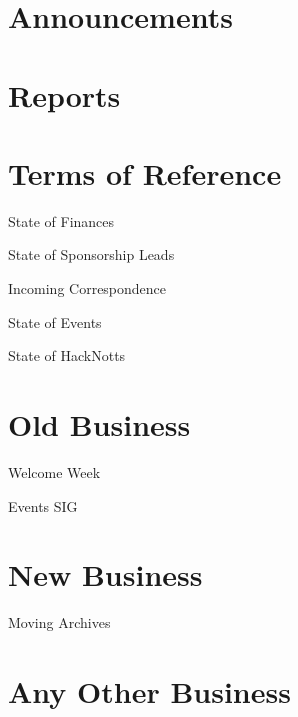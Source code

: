 \documentclass[11pt,hacksoc,agenda]{meetingmins}
\begin{document}
\maketitle

\section{Announcements}

\section{Reports}

\section{Terms of Reference}
\begin{items}
\item {State of Finances}
\item {State of Sponsorship Leads}
\item {Incoming Correspondence}
\item {State of Events}
\item {State of HackNotts}
\end{items}

\section{Old Business}
\begin{items}
\item {Welcome Week} 
\item {Events SIG}
\end{items}

\section{New Business}
\begin{items}
\item {Moving Archives}
\end{items}

\section{Any Other Business}

\vspace{1em}
\end{document}
